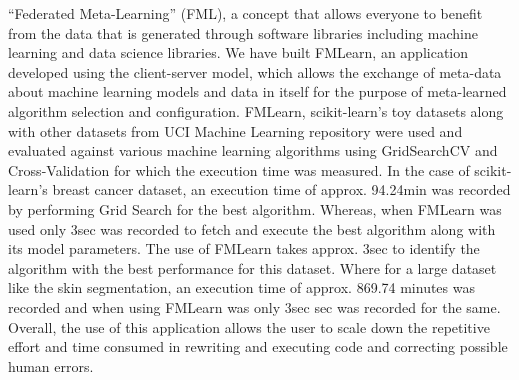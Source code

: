 \quad\quad “Federated Meta-Learning” (FML), a concept that allows everyone to benefit from the data that is generated through software libraries including machine learning and data science libraries. We have built FMLearn, an application developed using the client-server model, which allows the exchange of meta-data about machine learning models and data in itself for the purpose of meta-learned algorithm selection and configuration. FMLearn, scikit-learn’s toy datasets along with other datasets from UCI Machine Learning repository were used and evaluated against various machine learning algorithms using GridSearchCV and Cross-Validation for which the execution time was measured. 
{In the case of scikit-learn’s breast cancer dataset, an execution time of approx. 94.24min was recorded by performing Grid Search for the best algorithm. Whereas, when FMLearn was used only 3sec was recorded to fetch and execute the best algorithm along with its model parameters. The use of FMLearn takes approx. 3sec to identify the algorithm with the best performance for this dataset.}
{Where for a large dataset like the skin segmentation, an execution time of approx. 869.74 minutes was recorded and when using FMLearn was only 3sec sec was recorded for the same.}
Overall, the use of this application allows the user to scale down the repetitive effort and time consumed in rewriting and executing code and correcting possible human errors.


